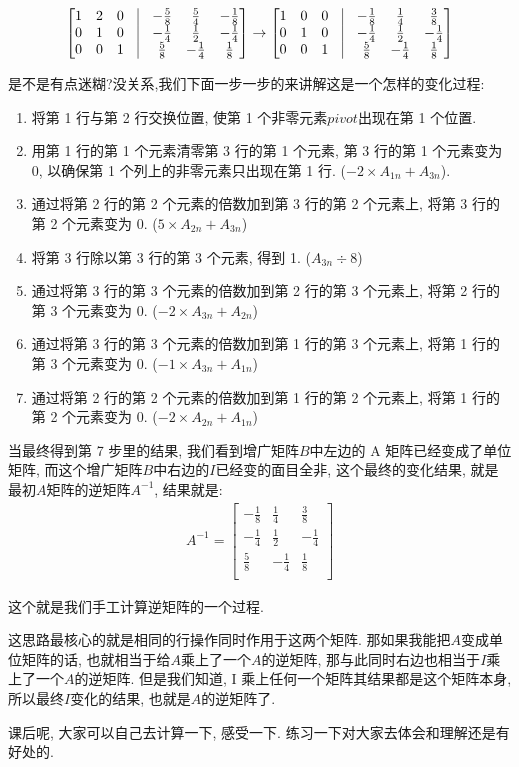 \begin{align*}
  \begin{bmatrix}
    1 & 2 & 0 & \vline & -\frac{5}{8} & \frac{5}{4} & -\frac{1}{8} \\
    0 & 1 & 0 & \vline & -\frac{1}{4} & \frac{1}{2} & -\frac{1}{4} \\
    0 & 0 & 1 & \vline & \frac{5}{8} & -\frac{1}{4} & \frac{1}{8} \\
  \end{bmatrix}
  \rightarrow
  \begin{bmatrix}
    1 & 0 & 0 & \vline & -\frac{1}{8} & \frac{1}{4} & \frac{3}{8} \\
    0 & 1 & 0 & \vline & -\frac{1}{4} & \frac{1}{2} & -\frac{1}{4} \\
    0 & 0 & 1 & \vline & \frac{5}{8} & -\frac{1}{4} & \frac{1}{8} \\
  \end{bmatrix}
\end{align*}

是不是有点迷糊?没关系,我们下面一步一步的来讲解这是一个怎样的变化过程:

\begin{enumerate}
  \item 将第 1 行与第 2 行交换位置, 使第 1 个非零元素$\mathord{pivot}$出现在第 1 个位置. 
  \item 用第 1 行的第 1 个元素清零第 3 行的第 1 个元素, 第 3 行的第 1 个元素变为 0, 以确保第 1 个列上的非零元素只出现在第 1 行. ($-2 \times A_{1n} + A_{3n}$).
  \item 通过将第 2 行的第 2 个元素的倍数加到第 3 行的第 2 个元素上, 将第 3 行的第 2 个元素变为 0. ($5 \times A_{2n} + A_{3n}$)
  \item 将第 3 行除以第 3 行的第 3 个元素, 得到 1. ($A_{3n} \div 8$)
  \item 通过将第 3 行的第 3 个元素的倍数加到第 2 行的第 3 个元素上, 将第 2 行的第 3 个元素变为 0. ($-2 \times A_{3n} + A_{2n}$)
  \item 通过将第 3 行的第 3 个元素的倍数加到第 1 行的第 3 个元素上, 将第 1 行的第 3 个元素变为 0. ($ -1 \times A_{3n} + A_{1n}$)
  \item 通过将第 2 行的第 2 个元素的倍数加到第 1 行的第 2 个元素上, 将第 1 行的第 2 个元素变为 0. ($ -2 \times A_{2n} + A_{1n}$)
\end{enumerate}

当最终得到第 7 步里的结果, 我们看到增广矩阵$B$中左边的 A 矩阵已经变成了单位矩阵, 而这个增广矩阵$B$中右边的$I$已经变的面目全非, 这个最终的变化结果, 就是最初$A$矩阵的逆矩阵$A^{-1}$, 结果就是:
\begin{align*}
A^{-1} = \begin{bmatrix} 
-\frac{1}{8} & \frac{1}{4} & \frac{3}{8} \\
-\frac{1}{4} & \frac{1}{2} & -\frac{1}{4} \\
\frac{5}{8} & -\frac{1}{4} & \frac{1}{8} \\
\end{bmatrix}
\end{align*}

这个就是我们手工计算逆矩阵的一个过程. 

这思路最核心的就是相同的行操作同时作用于这两个矩阵. 那如果我能把$A$变成单位矩阵的话, 也就相当于给$A$乘上了一个$A$的逆矩阵, 那与此同时右边也相当于$I$乘上了一个$A$的逆矩阵. 但是我们知道, I 乘上任何一个矩阵其结果都是这个矩阵本身, 所以最终$I$变化的结果, 也就是$A$的逆矩阵了. 

课后呢, 大家可以自己去计算一下, 感受一下. 练习一下对大家去体会和理解还是有好处的. 